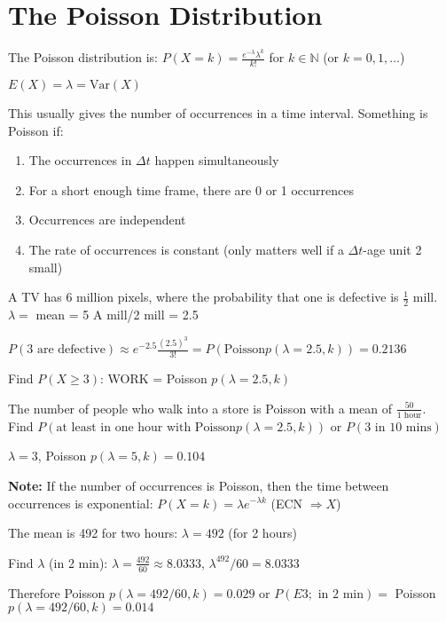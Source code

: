 \section{The Poisson Distribution}

\begin{definition}
The Poisson distribution is: $P(X = k) = \frac{e^{-\lambda} \lambda^k}{k!}$ for $k \in \mathbb{N}$ (or $k = 0, 1, \ldots$)

$E(X) = \lambda = \text{Var}(X)$
\end{definition}

This usually gives the number of occurrences in a time interval. Something is Poisson if:
\begin{enumerate}
\item The occurrences in $\Delta t$ happen simultaneously
\item For a short enough time frame, there are 0 or 1 occurrences
\item Occurrences are independent
\item The rate of occurrences is constant (only matters well if a $\Delta t$-age unit 2 small)
\end{enumerate}

\begin{example}
A TV has 6 million pixels, where the probability that one is defective is $\frac{1}{2}$ mill. $\lambda = $ mean = 5 A mill/2 mill = 2.5

$P(3 \text{ are defective}) \approx e^{-2.5} \frac{(2.5)^3}{3!} = P(\text{Poisson} p(\lambda = 2.5, k)) = 0.2136$
\end{example}

Find $P(X \geq 3)$: WORK = Poisson $p(\lambda = 2.5, k)$

\begin{example}
The number of people who walk into a store is Poisson with a mean of $\frac{50}{1 \text{ hour}}$. Find $P(\text{at least in one hour with Poisson} p(\lambda = 2.5, k))$ or $P(3 \text{ in } 10 \text{ mins})$

$\lambda = 3$, Poisson $p(\lambda = 5, k) = 0.104$
\end{example}

\textbf{Note:} If the number of occurrences is Poisson, then the time between occurrences is exponential: $P(X = k) = \lambda e^{-\lambda k}$ (ECN $\Rightarrow X$)

\begin{example}
The mean is 492 for two hours: $\lambda = 492$ (for 2 hours)

Find $\lambda$ (in 2 min): $\lambda = \frac{492}{60} \approx 8.0333$, $\lambda^{492}/60 = 8.0333$

Therefore Poisson $p(\lambda = 492/60, k) = 0.029$ or $P(E3; \text{ in } 2 \text{ min}) = $ Poisson $p(\lambda = 492/60, k) = 0.014$
\end{example}


